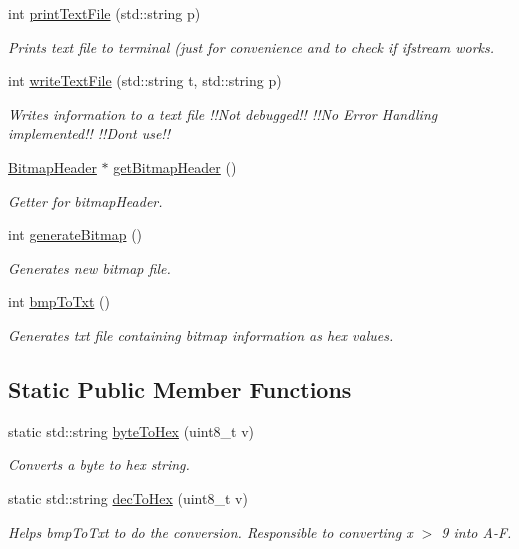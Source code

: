 \begin{DoxyCompactItemize}
int \mbox{\hyperlink{classImage_ae5daf791502caefeae1b15360d354513}{print\+Text\+File}} (std\+::string p)
\begin{DoxyCompactList}\small\item\em Prints text file to terminal (just for convenience and to check if ifstream works. \end{DoxyCompactList}\item 
int \mbox{\hyperlink{classImage_a2dc30c9d6280b8c0edd2f4f0ab474a5c}{write\+Text\+File}} (std\+::string t, std\+::string p)
\begin{DoxyCompactList}\small\item\em Writes information to a text file !!\+Not debugged!! !!\+No Error Handling implemented!! !!\+Dont use!! \end{DoxyCompactList}\item 
\mbox{\hyperlink{classBitmapHeader}{Bitmap\+Header}} $\ast$ \mbox{\hyperlink{classImage_a8c824ffac0c866a94752a2c1047932af}{get\+Bitmap\+Header}} ()
\begin{DoxyCompactList}\small\item\em Getter for bitmap\+Header. \end{DoxyCompactList}\item 
int \mbox{\hyperlink{classImage_a3ca1ae6c1eb2846bfba066b01e6020e1}{generate\+Bitmap}} ()
\begin{DoxyCompactList}\small\item\em Generates new bitmap file. \end{DoxyCompactList}\item 
int \mbox{\hyperlink{classImage_aa16c9acd068079c676dec4186262b1b7}{bmp\+To\+Txt}} ()
\begin{DoxyCompactList}\small\item\em Generates txt file containing bitmap information as hex values. \end{DoxyCompactList}\end{DoxyCompactItemize}
\subsection*{Static Public Member Functions}
\begin{DoxyCompactItemize}
\item 
static std\+::string \mbox{\hyperlink{classImage_ac1c14eba8a20f8bb71c3c21eaba90ecb}{byte\+To\+Hex}} (uint8\+\_\+t v)
\begin{DoxyCompactList}\small\item\em Converts a byte to hex string. \end{DoxyCompactList}\item 
static std\+::string \mbox{\hyperlink{classImage_a26f7e0b2649e2529df7e7aea46f2da4a}{dec\+To\+Hex}} (uint8\+\_\+t v)
\begin{DoxyCompactList}\small\item\em Helps bmp\+To\+Txt to do the conversion. Responsible to converting x $>$ 9 into A-\/F. \end{DoxyCompactList}\end{DoxyCompactItemize}
